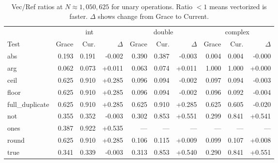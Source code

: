 \begin{table}[H]
\centering
\caption{Vec/Ref ratios at $N \approx 1{,}050{,}625$ for unary operations. Ratio $< 1$ means vectorized is faster. $\Delta$ shows change from Grace to Current.}
\label{tab:ratio-unary}
\small
\begin{tabular}{l | r r r | r r r | r r r}
\toprule
 & \multicolumn{3}{c|}{int} & \multicolumn{3}{c|}{double} & \multicolumn{3}{c}{complex} \\
Test & Grace & Cur. & $\Delta$ & Grace & Cur. & $\Delta$ & Grace & Cur. & $\Delta$ \\
\midrule
  abs & 0.193 & 0.191 & -0.002 & 0.390 & 0.387 & -0.003 & 0.004 & 0.004 & -0.000 \\
  arg & 0.062 & 0.073 & +0.011 & 0.063 & 0.074 & +0.011 & 1.000 & 1.000 & +0.000 \\
  ceil & 0.625 & 0.910 & +0.285 & 0.096 & 0.094 & -0.002 & 0.097 & 0.094 & -0.003 \\
  floor & 0.625 & 0.910 & +0.285 & 0.096 & 0.094 & -0.002 & 0.096 & 0.092 & -0.004 \\
  full\_duplicate & 0.625 & 0.910 & +0.285 & 0.625 & 0.910 & +0.285 & 0.625 & 0.605 & -0.020 \\
  not & 0.355 & 0.352 & -0.003 & 0.302 & 0.853 & +0.551 & 0.299 & 0.841 & +0.541 \\
  ones & 0.387 & 0.922 & +0.535 & --- & --- & --- & --- & --- & --- \\
  round & 0.625 & 0.910 & +0.285 & 0.106 & 0.115 & +0.009 & 0.099 & 0.107 & +0.008 \\
  true & 0.341 & 0.339 & -0.003 & 0.313 & 0.853 & +0.540 & 0.290 & 0.841 & +0.551 \\
\bottomrule
\end{tabular}
\end{table}
